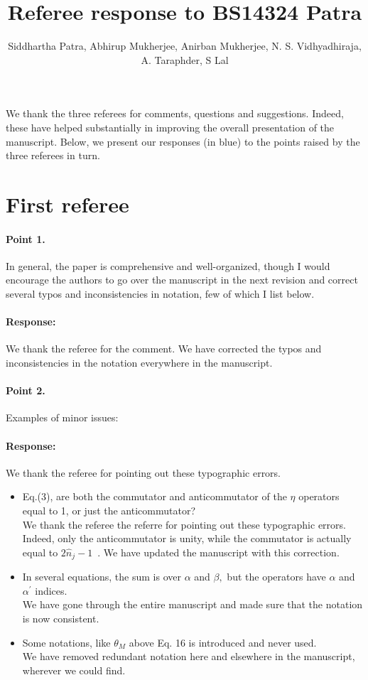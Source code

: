 \documentclass[11pt]{article}
\author{Siddhartha Patra, Abhirup Mukherjee, Anirban Mukherjee, N. S. Vidhyadhiraja, A. Taraphder, S Lal}
\title{Referee response to BS14324 Patra}
\begin{document}
\maketitle

We thank the three referees for comments, questions and suggestions. Indeed, these have helped substantially in improving the overall presentation of the manuscript. Below, we present our responses (in blue) to the points raised by the three referees in turn.

\section{First referee}

\paragraph{Point 1.}
In general, the paper is comprehensive and well-organized, though I would encourage the authors to go over the manuscript in the next revision and correct several typos and inconsistencies in notation, few of which I list below.
{\color{blue}\paragraph{Response:} We thank the referee for the comment. We have corrected the typos and inconsistencies in the notation everywhere in the manuscript.} 

\paragraph{Point 2.}
Examples of minor issues:
{\color{blue}\paragraph{Response:} We thank the referee for pointing out these typographic errors.} 
\begin{itemize}
	\item Eq.(3), are both the commutator and anticommutator of the $\eta$
operators equal to 1, or just the anticommutator?\\
{\color{blue}{\bf Response:} We thank the referee the referre for pointing out these typographic errors. Indeed, only the anticommutator is unity, while the commutator is actually equal to $2\hat n_j - 1$~\cite{anirbanurg1}. We have updated the manuscript with this correction.}
	\item In several equations, the sum is over $\alpha$ and $\beta,$ but the operators have $\alpha$ and $\alpha^\prime$ indices.\\
{\color{blue}{\bf Response:} We have gone through the entire manuscript and made sure that the notation is now consistent.}
	\item Some notations, like $\theta_M$ above Eq. 16 is introduced and never
	used.\\
{\color{blue}{\bf Response:} We have removed redundant notation here and elsewhere in the manuscript, wherever we could find.}
\end{itemize}
\end{document}
